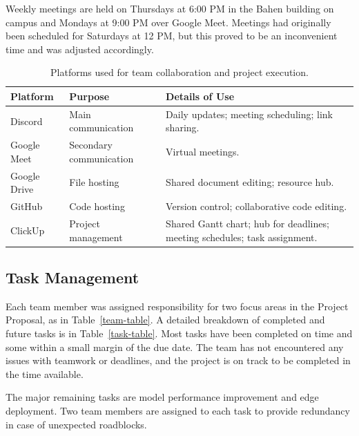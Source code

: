 \documentclass{article} %
\begin{document}
Weekly meetings are held on Thursdays at 6:00 PM in the Bahen building on campus and Mondays at 9:00 PM over Google Meet. Meetings had originally been scheduled for Saturdays at 12 PM, but this proved to be an inconvenient time and was adjusted accordingly.

\begin{table}[h!]
\captionsetup{justification=centering}
\caption{Platforms used for team collaboration and project execution.}
\label{platforms-table}
\centering
\renewcommand{\arraystretch}{1.5}
\setlength{\tabcolsep}{6pt}
\begin{tabularx}{\textwidth}{
  @{} >{\raggedright\arraybackslash}p{2.2cm} 
  >{\raggedright\arraybackslash}p{3cm} 
  >{\raggedright\arraybackslash}X @{}
}
\toprule
\textbf{Platform} & \textbf{Purpose} & \textbf{Details of Use} \\
\midrule
Discord & Main communication & Daily updates; meeting scheduling; link sharing. \\[8pt]

Google Meet & Secondary communication & Virtual meetings. \\[8pt]

Google Drive & File hosting & Shared document editing; resource hub. \\[8pt]

GitHub & Code hosting & Version control; collaborative code editing. \\[8pt]

ClickUp & Project management & Shared Gantt chart; hub for deadlines; meeting schedules; task assignment. \\
\bottomrule
\end{tabularx}
\end{table}

\subsection{Task Management}

Each team member was assigned responsibility for two focus areas in the Project Proposal, as in Table~\ref{team-table}. A detailed breakdown of completed and future tasks is in Table~\ref{task-table}. Most tasks have been completed on time and some within a small margin of the due date. The team has not encountered any issues with teamwork or deadlines, and the project is on track to be completed in the time available.

The major remaining tasks are model performance improvement and edge deployment. Two team members are assigned to each task to provide redundancy in case of unexpected roadblocks.
\end{document}

